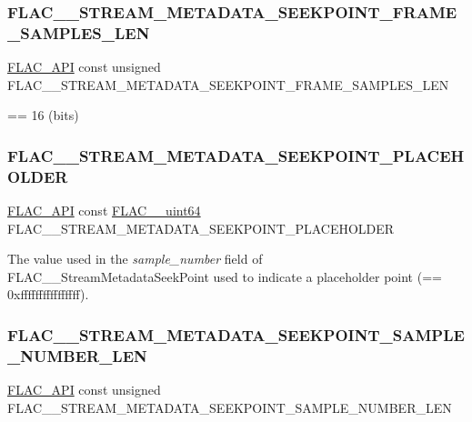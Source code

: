 \subsubsection{\texorpdfstring{FLAC\_\_STREAM\_METADATA\_SEEKPOINT\_FRAME\_SAMPLES\_LEN}{FLAC\_\_STREAM\_METADATA\_SEEKPOINT\_FRAME\_SAMPLES\_LEN}}
{\footnotesize\ttfamily \mbox{\hyperlink{group__flac__export_ga56ca07df8a23310707732b1c0007d6f5}{F\+L\+A\+C\+\_\+\+A\+PI}} const unsigned F\+L\+A\+C\+\_\+\+\_\+\+S\+T\+R\+E\+A\+M\+\_\+\+M\+E\+T\+A\+D\+A\+T\+A\+\_\+\+S\+E\+E\+K\+P\+O\+I\+N\+T\+\_\+\+F\+R\+A\+M\+E\+\_\+\+S\+A\+M\+P\+L\+E\+S\+\_\+\+L\+EN}

== 16 (bits) \mbox{\label{group__flac__format_ga39373aa806e3132146c1f29f35a23877}} 
\subsubsection{\texorpdfstring{FLAC\_\_STREAM\_METADATA\_SEEKPOINT\_PLACEHOLDER}{FLAC\_\_STREAM\_METADATA\_SEEKPOINT\_PLACEHOLDER}}
{\footnotesize\ttfamily \mbox{\hyperlink{group__flac__export_ga56ca07df8a23310707732b1c0007d6f5}{F\+L\+A\+C\+\_\+\+A\+PI}} const \mbox{\hyperlink{ordinals_8h_aa78c8c70a3eb8a58af7436f278acde8e}{F\+L\+A\+C\+\_\+\+\_\+uint64}} F\+L\+A\+C\+\_\+\+\_\+\+S\+T\+R\+E\+A\+M\+\_\+\+M\+E\+T\+A\+D\+A\+T\+A\+\_\+\+S\+E\+E\+K\+P\+O\+I\+N\+T\+\_\+\+P\+L\+A\+C\+E\+H\+O\+L\+D\+ER}

The value used in the {\itshape sample\+\_\+number} field of F\+L\+A\+C\+\_\+\+\_\+\+Stream\+Metadata\+Seek\+Point used to indicate a placeholder point (== 0xffffffffffffffff). \mbox{\label{group__flac__format_ga8fe65704a9be1ad13a1654e78ab80c32}} 
\subsubsection{\texorpdfstring{FLAC\_\_STREAM\_METADATA\_SEEKPOINT\_SAMPLE\_NUMBER\_LEN}{FLAC\_\_STREAM\_METADATA\_SEEKPOINT\_SAMPLE\_NUMBER\_LEN}}
{\footnotesize\ttfamily \mbox{\hyperlink{group__flac__export_ga56ca07df8a23310707732b1c0007d6f5}{F\+L\+A\+C\+\_\+\+A\+PI}} const unsigned F\+L\+A\+C\+\_\+\+\_\+\+S\+T\+R\+E\+A\+M\+\_\+\+M\+E\+T\+A\+D\+A\+T\+A\+\_\+\+S\+E\+E\+K\+P\+O\+I\+N\+T\+\_\+\+S\+A\+M\+P\+L\+E\+\_\+\+N\+U\+M\+B\+E\+R\+\_\+\+L\+EN}

